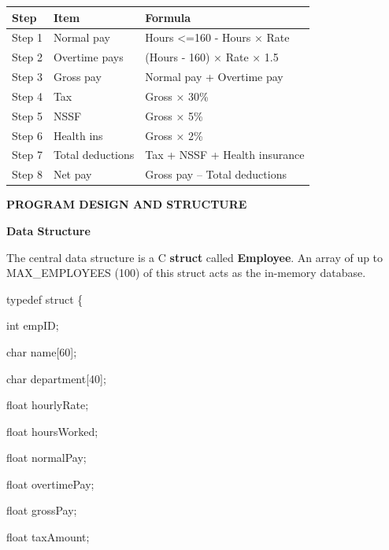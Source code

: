 \documentclass[
]{article}
\newcounter{none} %
\begin{document}
{\def\LTcaptype{none} %
\begin{longtable}[]{@{}
  >{\raggedright\arraybackslash}p{}
  >{\raggedright\arraybackslash}p{}
  >{\raggedright\arraybackslash}p{}@{}}
\toprule\noalign{}
\begin{minipage}[b]{\linewidth}\raggedright
Step
\end{minipage} & \begin{minipage}[b]{\linewidth}\raggedright
Item
\end{minipage} & \begin{minipage}[b]{\linewidth}\raggedright
Formula
\end{minipage} \\
\midrule\noalign{}
\endhead
\bottomrule\noalign{}
\endlastfoot
Step 1 & Normal pay & Hours \textless=160 - Hours × Rate \\
Step 2 & Overtime pays & (Hours - 160) × Rate × 1.5 \\
Step 3 & Gross pay & Normal pay + Overtime pay \\
Step 4 & Tax & Gross × 30\% \\
Step 5 & NSSF & Gross × 5\% \\
Step 6 & Health ins & Gross × 2\% \\
Step 7 & Total deductions & Tax + NSSF + Health insurance \\
Step 8 & Net pay & Gross pay -- Total deductions \\
\end{longtable}
}

\textbf{PROGRAM DESIGN AND STRUCTURE}

\textbf{Data Structure}

The central data structure is a C \textbf{struct} called
\textbf{Employee}. An array of up to MAX\_EMPLOYEES (100) of this struct
acts as the in-memory database.

typedef struct \{

int empID;

char name{[}60{]};

char department{[}40{]};

float hourlyRate;

float hoursWorked;

float normalPay;

float overtimePay;

float grossPay;

float taxAmount;
\end{document}

